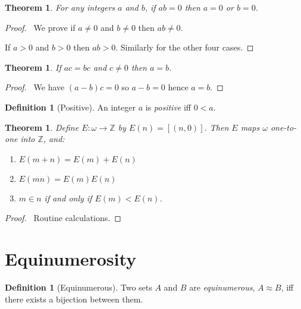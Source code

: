 \documentclass{article}
\let\qed\relax
\newtheorem{theorem}[axiom]{Theorem}
\theoremstyle{definition}
\newtheorem{definition}[axiom]{Definition}
\begin{document}
    \begin{theorem}
        \label{theorem:integers_no_zero_divisors}
        For any integers $a$ and $b$, if $ab = 0$ then $a = 0$ or $b = 0$.
    \end{theorem}

    \begin{proof}
        \pf\ We prove if $a \neq 0$ and $b \neq 0$ then $ab \neq 0$.
        
        If $a > 0$ and $b > 0$ then $ab > 0$. Similarly for the other four cases. \qed
    \end{proof}

    \begin{theorem}
        \label{theorem:integers_cancel}
        If $ac = bc$ and $c \neq 0$ then $a = b$.
    \end{theorem}

    \begin{proof}
        \pf\ We have $(a-b)c = 0$ so $a-b = 0$ hence $a = b$. \qed
    \end{proof}

    \begin{definition}[Positive]
        An integer $a$ is \emph{positive} iff $0 < a$.
    \end{definition}

    \begin{theorem}
        Define $E : \omega \rightarrow \mathbb{Z}$ by $E(n) = [(n,0)]$. Then $E$ maps $\omega$ one-to-one
        into $\mathbb{Z}$, and:
        \begin{enumerate}
            \item $E(m+n) = E(m) + E(n)$
            \item $E(mn) = E(m) E(n)$
            \item $m \in n$ if and only if $E(m) < E(n)$.
        \end{enumerate}
    \end{theorem}

    \begin{proof}
        \pf\ Routine calculations. \qed
    \end{proof}

    \section{Equinumerosity}

    \begin{definition}[Equinumerous]
        Two sets $A$ and $B$ are \emph{equinumerous}, $A \approx B$, iff there exists a bijection between
        them.
    \end{definition}
\end{document}
